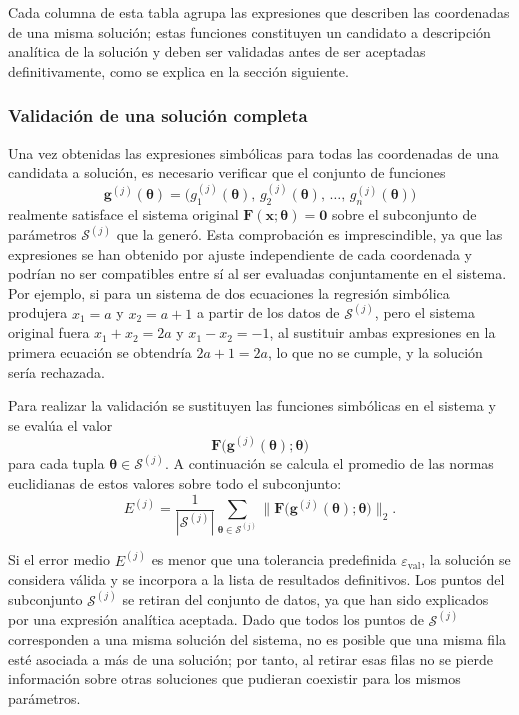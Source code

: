 \documentclass{article} \usepackage[utf8]{inputenc} \usepackage[spanish]{babel} \spanishdecimal{.} \usepackage{amsmath, amssymb, amsthm} \usepackage{bm} \usepackage{float} \usepackage{longtable} \usepackage[hidelinks]{hyperref}
\newcommand{\xvec}{\mathbf{x}} \newcommand{\thetavec}{\boldsymbol{\theta}} \newcommand{\Fvec}{\mathbf{F}} \newcommand{\R}{\mathbb{R}} \newcommand{\norm}[1]{\left\lVert#1\right\rVert} \newcommand{\loss}{\mathcal{L}} \newcommand{\dataset}{\mathcal{D}} \newcommand{\jac}{\mathbf{J}}
\begin{document}
Cada columna de esta tabla agrupa las expresiones que describen las
coordenadas de una misma solución; estas funciones constituyen un
candidato a descripción analítica de la solución y deben ser validadas
antes de ser aceptadas definitivamente, como se explica en la sección
siguiente.

\subsubsection{Validación de una solución completa}
\label{sec:validacion_solucion}

Una vez obtenidas las expresiones simbólicas para todas las coordenadas
de una candidata a solución, es necesario verificar que el conjunto de
funciones
\[
\mathbf{g}^{(j)}(\thetavec) = \bigl( g_1^{(j)}(\thetavec),\,
g_2^{(j)}(\thetavec),\, \dots,\, g_n^{(j)}(\thetavec) \bigr)
\]
realmente satisface el sistema original \(\Fvec(\xvec; \thetavec) =
\mathbf{0}\) sobre el subconjunto de parámetros \(\mathcal{S}^{(j)}\)
que la generó. Esta comprobación es imprescindible, ya que las
expresiones se han obtenido por ajuste independiente de cada
coordenada y podrían no ser compatibles entre sí al ser evaluadas
conjuntamente en el sistema. Por ejemplo, si para un sistema de dos
ecuaciones la regresión simbólica produjera \(x_1 = a\) y
\(x_2 = a + 1\) a partir de los datos de \(\mathcal{S}^{(j)}\), pero
el sistema original fuera \(x_1 + x_2 = 2a\) y \(x_1 - x_2 = -1\),
al sustituir ambas expresiones en la primera ecuación se obtendría
\(2a + 1 = 2a\), lo que no se cumple, y la solución sería
rechazada.

Para realizar la validación se sustituyen las funciones simbólicas en el
sistema y se evalúa el valor
\[
\Fvec\bigl( \mathbf{g}^{(j)}(\thetavec); \thetavec \bigr)
\]
para cada tupla \(\thetavec \in \mathcal{S}^{(j)}\). A continuación se
calcula el promedio de las normas euclidianas de estos valores sobre
todo el subconjunto:
\[
E^{(j)} = \frac{1}{|\mathcal{S}^{(j)}|}
\sum_{\thetavec \in \mathcal{S}^{(j)}}
\bigl\| \Fvec\bigl( \mathbf{g}^{(j)}(\thetavec); \thetavec \bigr) \bigr\|_2.
\]

Si el error medio \(E^{(j)}\) es menor que una tolerancia predefinida
\(\varepsilon_{\text{val}}\), la solución se considera válida y se
incorpora a la lista de resultados definitivos. Los puntos del
subconjunto \(\mathcal{S}^{(j)}\) se retiran del conjunto de datos,
ya que han sido explicados por una expresión analítica aceptada. Dado
que todos los puntos de \(\mathcal{S}^{(j)}\) corresponden a una misma
solución del sistema, no es posible que una misma fila esté asociada
a más de una solución; por tanto, al retirar esas filas no se pierde
información sobre otras soluciones que pudieran coexistir para los
mismos parámetros.
\end{document}
